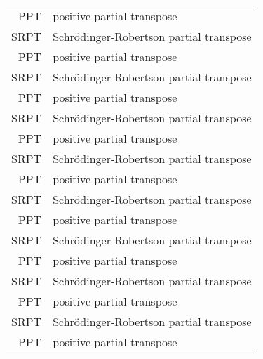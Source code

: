 \begin{longtable}{rl}
PPT & positive partial transpose\\
SRPT & Schr\"odinger-Robertson partial transpose\\
PPT & positive partial transpose\\
SRPT & Schr\"odinger-Robertson partial transpose\\
PPT & positive partial transpose\\
SRPT & Schr\"odinger-Robertson partial transpose\\
PPT & positive partial transpose\\
SRPT & Schr\"odinger-Robertson partial transpose\\
PPT & positive partial transpose\\
SRPT & Schr\"odinger-Robertson partial transpose\\
PPT & positive partial transpose\\
SRPT & Schr\"odinger-Robertson partial transpose\\
PPT & positive partial transpose\\
SRPT & Schr\"odinger-Robertson partial transpose\\
PPT & positive partial transpose\\
SRPT & Schr\"odinger-Robertson partial transpose\\
PPT & positive partial transpose
\end{longtable}